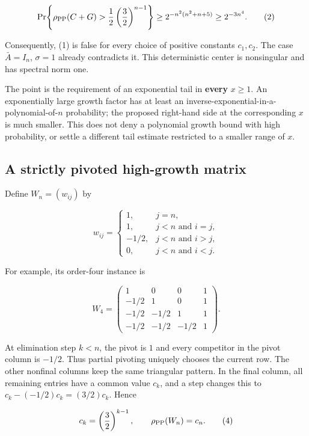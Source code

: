 \documentclass[10pt,a4paper]{article}
\begin{document}
\[
\Pr\!\left\{\rho_{\rm PP}(C+G)>
\frac12\left(\frac32\right)^{n-1}\right\}
\geq 2^{-n^2(n^2+n+5)}
\geq 2^{-3n^4}.
\tag{2}
\]

Consequently, (1) is false for every choice of positive constants
\(c_1,c_2\). The case \(\bar A=I_n\), \(\sigma=1\) already contradicts
it. This deterministic center is nonsingular and has spectral norm one.

The point is the requirement of an exponential tail in \textbf{every}
\(x\geq1\). An exponentially large growth factor has at least an
inverse-exponential-in-a-polynomial-of-\(n\) probability; the proposed
right-hand side at the corresponding \(x\) is much smaller. This does
not deny a polynomial growth bound with high probability, or settle a
different tail estimate restricted to a smaller range of \(x\).

\subsection{A strictly pivoted high-growth
matrix}\label{a-strictly-pivoted-high-growth-matrix}

Define \(W_n=(w_{ij})\) by

\nopagebreak[4]

\[
w_{ij}=\begin{cases}
1,&j=n,\\
1,&j<n\text{ and }i=j,\\
-1/2,&j<n\text{ and }i>j,\\
0,&j<n\text{ and }i<j.
\end{cases}
\tag{3}
\]

For example, its order-four instance is

\nopagebreak[4]

\[
W_4=\begin{pmatrix}
1&0&0&1\\
-1/2&1&0&1\\
-1/2&-1/2&1&1\\
-1/2&-1/2&-1/2&1
\end{pmatrix}.
\]

At elimination step \(k<n\), the pivot is \(1\) and every competitor in
the pivot column is \(-1/2\). Thus partial pivoting uniquely chooses the
current row. The other nonfinal columns keep the same triangular
pattern. In the final column, all remaining entries have a common value
\(c_k\), and a step changes this to \(c_k-(-1/2)c_k=(3/2)c_k\). Hence

\nopagebreak[4]

\[
c_k=\left(\frac32\right)^{k-1},\qquad
\rho_{\rm PP}(W_n)=c_n.
\tag{4}
\]
\end{document}
